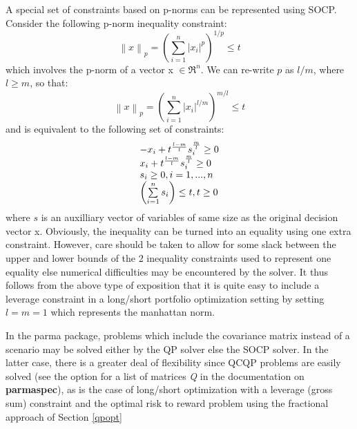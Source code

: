 A special set of constraints based on p-norms can be represented using SOCP. Consider the following
p-norm inequality constraint:
\begin{equation}
{\left\| x \right\|_p} = {\left( {\sum\limits_{i = 1}^n {{{\left| {{x_i}} \right|}^p}} } \right)^{1/p}} \le t
\end{equation}
which involves the p-norm of a vector x $\in \Re^n$. We can re-write $p$ as $l/m$, where $l\ge m$, so that:
\begin{equation}
{\left\| x \right\|_p} = {\left( {\sum\limits_{i = 1}^n {{{\left| {{x_i}} \right|}^{l/m}}} } \right)^{m/l}} \le t
\end{equation}
and is equivalent to the following set of constraints:
\begin{equation}
\begin{array}{l}
 - {x_i} + {t^{\frac{{l - m}}{l}}}s_i^{\frac{m}{l}} \ge 0\\
{x_i} + {t^{\frac{{l - m}}{l}}}s_i^{\frac{m}{l}} \ge 0\\
{s_i} \ge 0,{\rm{  }}i = 1,...,n\\
\left( {\sum\limits_{i = 1}^n {{s_i}} } \right) \le t,{\rm{  }}t \ge 0
\end{array}
\end{equation}
where $s$ is an auxilliary vector of variables of same size as the original decision vector x. Obviously, the inequality can be turned into an equality using one extra constraint. However, care should be taken to allow for some slack between the upper and lower bounds of the 2 inequality constraints used to represent one equality else numerical difficulties may be encountered by the solver. It thus follows from the above type of exposition that it is quite easy to include a leverage constraint in a long/short portfolio optimization setting by setting $l=m=1$ which represents the manhattan norm.

In the parma package, problems which include the covariance matrix instead of a scenario may be solved either by the QP solver else the SOCP solver. In the latter case, there is a greater deal of flexibility since QCQP problems are easily solved (see the option for a list of matrices \emph{Q} in the documentation on \textbf{parmaspec}), as is the case of long/short optimization with a leverage (gross sum) constraint and the optimal risk to reward problem using the fractional approach of Section \ref{qpopt}


